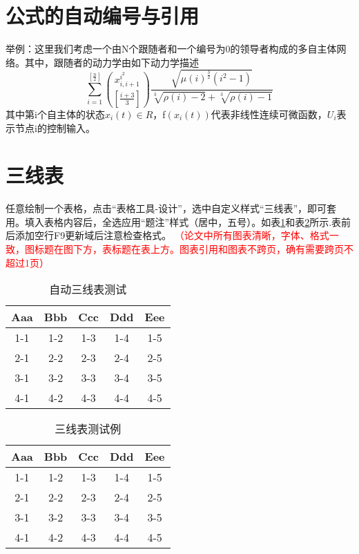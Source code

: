 \section{公式的自动编号与引用}
举例：这里我们考虑一个由N个跟随者和一个编号为0的领导者构成的多自主体网络。其中，跟随者的动力学由如下动力学描述
\begin{equation}
\sum_{i=1}^{\left[ \frac{n}{2}\right]} \binom{x_{i,i+1}^{i^2}}
{\left[\frac{i+3}{3} \right]} \frac{\sqrt{\mu(i)^{\frac{3}{2}}
(i^2-1)}} {\sqrt[3]{\rho(i)-2}+\sqrt[3]{\rho(i)-1}}
\end{equation}
其中第i个自主体的状态$x_i (t)\in R$，f$(x_i (t))$代表非线性连续可微函数，$U_i$表示节点i的控制输入。


\section{三线表}
任意绘制一个表格，点击“表格工具-设计”，选中自定义样式“三线表”，即可套用。填入表格内容后，全选应用“题注”样式（居中，五号）。如表\ref{Tab2-1}和表\ref{Tab2-2}所示.表前后添加空行F9更新域后注意检查格式。 
\textcolor{red}{（论文中所有图表清晰，字体、格式一致，图标题在图下方，表标题在表上方。图表引用和图表不跨页，确有需要跨页不超过1页）}

\begin{table}[htbp]
  \centering
  \caption{自动三线表测试}
    \begin{tabular}{ccccc}
    \toprule
    Aaa & Bbb & Ccc & Ddd & Eee \\
    \midrule
    1-1  & 1-2  & 1-3 & 1-4 & 1-5 \\
    2-1  & 2-2  & 2-3 & 2-4 & 2-5 \\
    3-1  & 3-2  & 3-3 & 3-4 & 3-5 \\
    4-1  & 4-2  & 4-3 & 4-4 & 4-5 \\
    \bottomrule
    \end{tabular}%
  \label{Tab2-1}%
\end{table}%

\begin{table}[htbp]
  \centering
  \caption{三线表测试例}
    \begin{tabular}{ccccc}
    \toprule
    Aaa & Bbb & Ccc & Ddd & Eee \\
    \midrule
    1-1  & 1-2  & 1-3 & 1-4 & 1-5 \\
    2-1  & 2-2  & 2-3 & 2-4 & 2-5 \\
    3-1  & 3-2  & 3-3 & 3-4 & 3-5 \\
    4-1  & 4-2  & 4-3 & 4-4 & 4-5 \\
    \bottomrule
    \end{tabular}%
  \label{Tab2-2}%
\end{table}%


